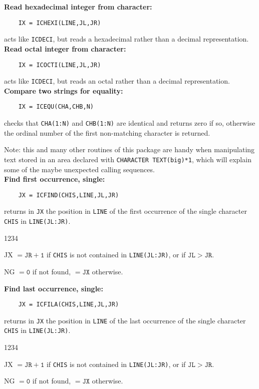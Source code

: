 {\bf Read hexadecimal integer from character:}
\begin{verbatim}
    IX = ICHEXI(LINE,JL,JR)
\end{verbatim}
acts like {\tt ICDECI},
but reads a hexadecimal rather than a decimal representation. \\[2mm]
{\bf Read octal integer from character:}
\begin{verbatim}
    IX = ICOCTI(LINE,JL,JR)
\end{verbatim}
acts like {\tt ICDECI},
but reads an octal rather than a decimal representation. \\[2mm]
{\bf Compare two strings for equality:}
\begin{verbatim}
    IX = ICEQU(CHA,CHB,N)
\end{verbatim}
checks that {\tt CHA(1:N)} and {\tt CHB(1:N)} are identical
and returns zero if so, otherwise the ordinal number of the first
non-matching character is returned.
\par
Note: this and many other routines of this package are handy when
manipulating text stored in an area declared with
{\tt CHARACTER TEXT(big)*1}, which will explain some of
the maybe unexpected calling sequences.\\[2mm]
\newpage
{\bf Find first occurrence, single:}
\begin{verbatim}
    JX = ICFIND(CHIS,LINE,JL,JR)
\end{verbatim}
returns in {\tt JX} the position in {\tt LINE} of the first occurrence
of the single character {\tt CHIS} in {\tt LINE(JL:JR)}.
\begin{DLtt}{1234}
\item[JX] $\mathtt{=JR+1}$ if {\tt CHIS} is not contained in
{\tt LINE(JL:JR)},
or if $\mathtt{JL > JR}$.
\item[NG] $\mathtt{=0}$ if not found, $\mathtt{=JX}$ otherwise.
\end{DLtt}
{\bf Find last occurrence, single:}
\begin{verbatim}
    JX = ICFILA(CHIS,LINE,JL,JR)
\end{verbatim}
returns in {\tt JX} the position in {\tt LINE} of the last occurrence of
the single character {\tt CHIS} in {\tt LINE(JL:JR)}.
\begin{DLtt}{1234}
\item[JX] $\mathtt{=JR+1}$ if {\tt CHIS} is not contained in
{\tt LINE(JL:JR)},
or if $\mathtt{JL > JR}$.
\item[NG] $\mathtt{=0}$ if not found, $\mathtt{=JX}$ otherwise.
\end{DLtt}

